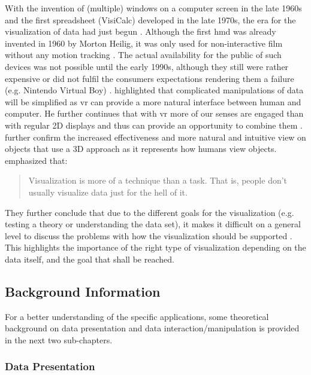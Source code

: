 With the invention of (multiple) windows on a computer screen in the late 1960s and the first spreadsheet (VisiCalc) developed in the late 1970s, the era for the visualization of data had just begun \citep{Myers1998}. Although the first \gls{hmd} was already invented in 1960 by Morton Heilig, it was only used for non-interactive film without any motion tracking \citep{vrs2015}. The actual availability for the public of such devices was not possible until the early 1990s, although they still were rather expensive or did not fulfil the consumers expectations rendering them a failure (e.g. Nintendo Virtual Boy) \citep{vrs2015}. \cite{Ribarsky1994} highlighted that complicated manipulations of data will be simplified as \gls{vr} can provide a more natural interface between human and computer. He further continues that with \gls{vr} more of our senses are engaged than with regular 2D displays and thus can provide an opportunity to combine them \citep{Ribarsky1994}. \cite{Jamieson2007} further confirm the increased effectiveness and more natural and intuitive view on objects that use a 3D approach as it represents how humans view objects. \newline
\citet[p.411]{Stone1994} emphasized that: \blockquote{Visualization is more of a technique than a task. That is, people don't usually visualize data just for the hell of it.} They further conclude that due to the different goals for the visualization (e.g. testing a theory or understanding the data set), it makes it difficult on a general level to discuss the problems with how the visualization should be supported \citep{Stone1994}. This highlights the importance of the right type of visualization depending on the data itself, and the goal that shall be reached. 



\subsection{Background Information}

For a better understanding of the specific applications, some theoretical background on data presentation and data interaction/manipulation is provided in the next two sub-chapters.


\subsubsection{Data Presentation}

